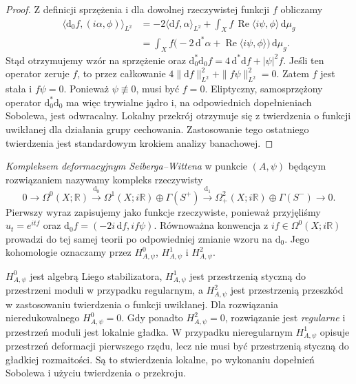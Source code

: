\begin{proof}
Z definicji sprzężenia i dla dowolnej rzeczywistej funkcji
$f$ obliczamy
\[
\begin{aligned}
\langle \mathrm d_0f,(i\alpha,\phi)\rangle_{L^2}
&=-2\langle\mathrm df,\alpha\rangle_{L^2}
+\int_X f\,\operatorname{Re}\langle i\psi,\phi\rangle
\,\mathrm d\mu_g\\
&=\int_X f\bigl(-2\,\mathrm d^*\alpha
+\operatorname{Re}\langle i\psi,\phi\rangle\bigr)
\,\mathrm d\mu_g.
\end{aligned}
\]
Stąd otrzymujemy wzór na sprzężenie oraz
$\mathrm d_0^*\mathrm d_0f=4\,\mathrm d^*\mathrm df+|\psi|^2f$.
Jeśli ten operator zeruje $f$, to przez całkowanie
$4\|\mathrm df\|_{L^2}^2+\|f\psi\|_{L^2}^2=0$.
Zatem $f$ jest stała i $f\psi=0$. Ponieważ
$\psi\not\equiv0$, musi być $f=0$.
Eliptyczny, samosprzężony operator $\mathrm d_0^*\mathrm d_0$
ma więc trywialne jądro i, na odpowiednich dopełnieniach
Sobolewa, jest odwracalny. Lokalny przekrój otrzymuje się
z twierdzenia o funkcji uwikłanej dla działania grupy
cechowania. Zastosowanie tego ostatniego twierdzenia
jest standardowym krokiem analizy banachowej.
\end{proof}

\begin{definicja}
\emph{Kompleksem deformacyjnym Seiberga--Wittena} w punkcie
$(A,\psi)$ będącym rozwiązaniem nazywamy kompleks rzeczywisty
\[
0\longrightarrow\Omega^0(X;\mathbb R)
\xrightarrow{\mathrm d_0}\Omega^1(X;i\mathbb R)\oplus\Gamma(S^+)
\xrightarrow{\mathrm d_1}\Omega^2_+(X;i\mathbb R)\oplus\Gamma(S^-)
\longrightarrow0.
\]
Pierwszy wyraz zapisujemy jako funkcje rzeczywiste,
ponieważ przyjęliśmy $u_t=e^{itf}$ oraz
$\mathrm d_0f=(-2i\,\mathrm df,if\psi)$.
Równoważna konwencja z $if\in\Omega^0(X;i\mathbb R)$
prowadzi do tej samej teorii po odpowiedniej zmianie wzoru
na $\mathrm d_0$. Jego kohomologie oznaczamy przez
$H^0_{A,\psi}$, $H^1_{A,\psi}$ i $H^2_{A,\psi}$.
\end{definicja}

\begin{uwaga}
$H^0_{A,\psi}$ jest algebrą Liego stabilizatora,
$H^1_{A,\psi}$ jest przestrzenią styczną do przestrzeni
moduli w przypadku regularnym, a $H^2_{A,\psi}$ jest
przestrzenią przeszkód w zastosowaniu twierdzenia o funkcji
uwikłanej. Dla rozwiązania nieredukowalnego
$H^0_{A,\psi}=0$. Gdy ponadto $H^2_{A,\psi}=0$, rozwiązanie
jest \emph{regularne} i przestrzeń moduli jest lokalnie gładka.
W przypadku nieregularnym $H^1_{A,\psi}$ opisuje
przestrzeń deformacji pierwszego rzędu, lecz nie musi być
przestrzenią styczną do gładkiej rozmaitości.
Są to stwierdzenia lokalne, po wykonaniu dopełnień Sobolewa
i użyciu twierdzenia o przekroju.
\end{uwaga}

